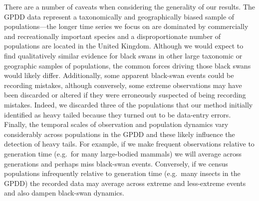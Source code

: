 There are a number of caveats when considering the generality of our results.
The GPDD data represent a taxonomically and geographically biased sample of
populations---the longer time series we focus on are dominated by commercially
and recreationally important species and a disproportionate number of
populations are located in the United Kingdom. Although we would expect to find
qualitatively similar evidence for black swans in other large taxonomic or
geographic samples of populations, the common forces driving those black swans
would likely differ. Additionally, some apparent black-swan events could be
recording mistakes, although conversely, some extreme observations may have been
discarded or altered if they were erroneously suspected of being recording
mistakes. Indeed, we discarded three of the populations that our method
initially identified as heavy tailed because they turned out to be data-entry
errors. Finally, the temporal scales of observation and population dynamics
vary considerably across populations in the GPDD and these likely influence the
detection of heavy tails. For example, if we make frequent observations
relative to generation time (e.g.~for many large-bodied mammals) we will
average across generations and perhaps miss black-swan events. Conversely, if
we census populations infrequently relative to generation time (e.g.~many
insects in the GPDD) the recorded data may average across extreme and
less-extreme events and also dampen black-swan dynamics.



